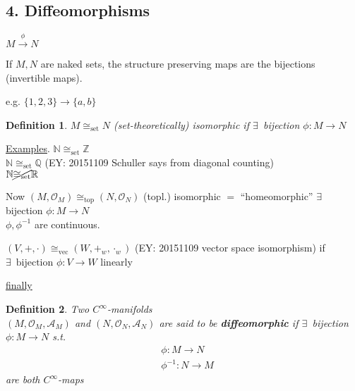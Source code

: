 \documentclass[10pt, twoside]{amsart}
\newtheorem{definition}{Definition}
\begin{document}
\begin{multicols*}{2}
\subsection{4. Diffeomorphisms}

$M \xrightarrow{ \phi } N$

If $M,N$ are naked sets, the structure preserving maps are the bijections (invertible maps).  

e.g. $\lbrace 1,2,3 \rbrace \to \lbrace a,b \rbrace$

\begin{definition}
  $M \cong_{\text{set}} N$ (set-theoretically) isomorphic if $\exists \, $ bijection $\phi : M \to N$
\end{definition}

\underline{Examples}.  $\mathbb{N} \cong_{\text{set}} \mathbb{Z}$ \\
$\mathbb{N} \cong_{\text{set}} \mathbb{Q}$  (EY: 20151109 Schuller says from diagonal counting)\\
$\mathbb{N} \cancel{\cong_{\text{set}}} \mathbb{R}$

Now $(M, \mathcal{O}_M) \cong_{\text{top}} (N,\mathcal{O}_N)$ (topl.) isomorphic $=$ ``homeomorphic'' $\exists \, $ bijection $\phi : M \to N$  \\
\phantom{ \quad \quad \, } $\phi, \phi^{-1}$ are continuous.  

$(V,+,\cdot) \cong_{\text{vec}} ( W,+_w,\cdot_w)$ (EY: 20151109 vector space isomorphism) if \\
$\exists \, \text{ bijection } \phi : V \to W$ linearly

\underline{finally}

\begin{definition}
  Two $C^{\infty}$-manifolds \\
  $(M,\mathcal{O}_M, \mathcal{A}_M)$ and $(N,\mathcal{O}_N, \mathcal{A}_N)$ are said to be \textbf{diffeomorphic} if $\exists \, $ bijection $\phi : M \to N$ s.t. 
\[
\begin{aligned} & \phi : M \to N \\
  & \phi^{-1} : N \to M \end{aligned}
    \]
are both $C^{\infty}$-maps


\end{definition}
\end{multicols*}
\end{document}
